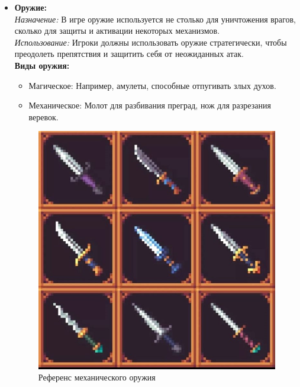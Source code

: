 \documentclass{article}
\begin{document}
\begin{itemize}
		
		\item \textbf{Оружие:}  \\
		\textit{Назначение:} В игре оружие используется не столько для уничтожения врагов, сколько для защиты и активации некоторых механизмов.  \\
		\textit{Использование:} Игроки должны использовать оружие стратегически, чтобы преодолеть препятствия и защитить себя от неожиданных атак.  \\
		\textbf{Виды оружия:}  
		\begin{itemize}
			\item Магическое: Например, амулеты, способные отпугивать злых духов.
			\item Механическое: Молот для разбивания преград, нож для разрезания веревок.
		\end{itemize}
		\begin{figure}[H]
			\begin{minipage}{0.4\textwidth}
				\centering
				\includegraphics[width=\textwidth]{images/knives.jpg}
				\caption{Референс механического оружия}
				\label{fig:weapon1}
			\end{minipage}
			\hfill
			\begin{minipage}{0.4\textwidth}
				\centering

\end{minipage}
\end{figure}
\end{itemize}
\end{document}
